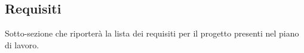 \subsection{Requisiti}

Sotto-sezione che riporterà la lista dei requisiti per il progetto presenti nel piano di lavoro.
